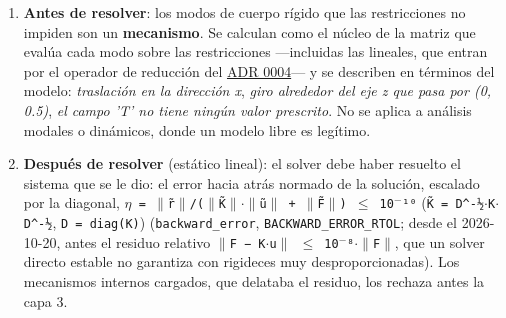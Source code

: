 \documentclass[11pt,oneside]{report}
\begin{document}
\begin{enumerate}
  \item \textbf{Antes de resolver}: los modos de cuerpo rígido que las restricciones no impiden son un \textbf{mecanismo}. Se calculan como el núcleo de la matriz que evalúa cada modo sobre las restricciones ---incluidas las lineales, que entran por el operador de reducción del \hyperref[adr:0004]{ADR 0004}--- y se describen en términos del modelo: \textit{\textquotedbl{}traslación en la dirección x\textquotedbl{}}, \textit{\textquotedbl{}giro alrededor del eje z que pasa por (0, 0.5)\textquotedbl{}}, \textit{\textquotedbl{}el campo 'T' no tiene ningún valor prescrito\textquotedbl{}}. No se aplica a análisis modales o dinámicos, donde un modelo libre es legítimo.
  \item \textbf{Después de resolver} (estático lineal): el solver debe haber resuelto el sistema que se le dio: el error hacia atrás normado de la solución, escalado por la diagonal, \texttt{\ensuremath{\eta} = \ensuremath{\|}r̃\ensuremath{\|}/\allowbreak{}(\ensuremath{\|}K̃\ensuremath{\|}\ensuremath{\cdot}\ensuremath{\|}ũ\ensuremath{\|} + \ensuremath{\|}F̃\ensuremath{\|}) \ensuremath{\le} 10\ensuremath{^{-}}¹⁰} (\texttt{K̃ = D\textasciicircum{}-½\ensuremath{\cdot}K\ensuremath{\cdot}D\textasciicircum{}-½}, \texttt{D = diag(K)}) (\texttt{backward\_error}, \texttt{BACKWARD\_\allowbreak{}ERROR\_\allowbreak{}RTOL}; desde el 2026-10-20, antes el residuo relativo \texttt{\ensuremath{\|}F − K\ensuremath{\cdot}u\ensuremath{\|} \ensuremath{\le} 10\ensuremath{^{-}}⁸\ensuremath{\cdot}\ensuremath{\|}F\ensuremath{\|}}, que un solver directo estable no garantiza con rigideces muy desproporcionadas). Los mecanismos internos cargados, que delataba el residuo, los rechaza antes la capa 3.

\end{enumerate}
\end{document}
